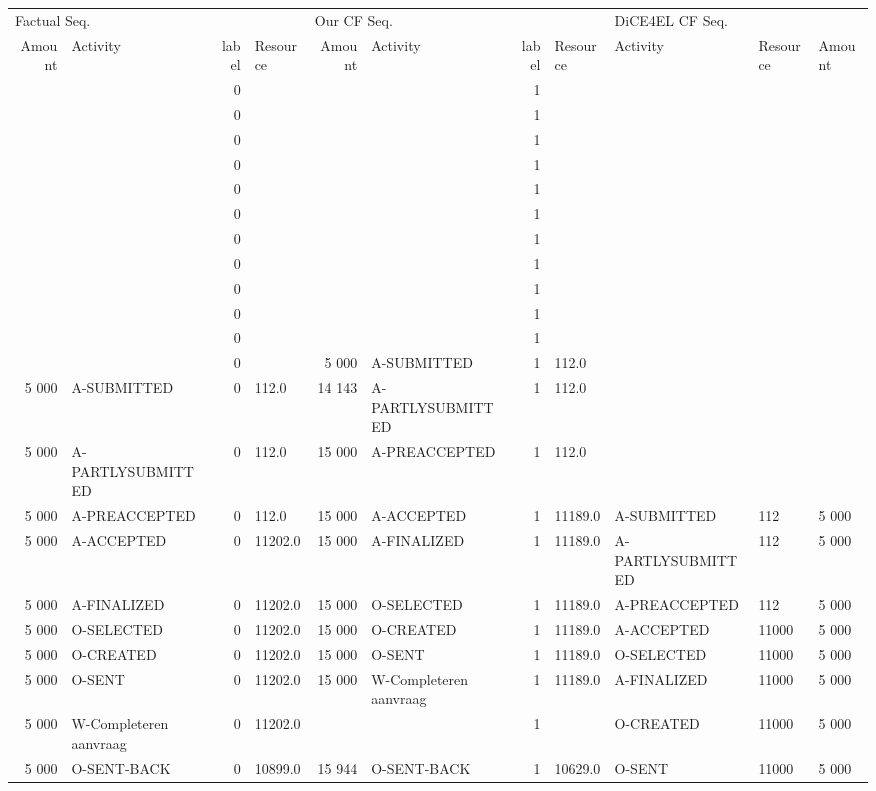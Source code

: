 \begin{tabular}{rlrlrlrllll}
\toprule
\multicolumn{4}{l}{Factual Seq.} & \multicolumn{4}{l}{Our CF Seq.} & \multicolumn{3}{l}{DiCE4EL CF Seq.} \\
Amount & Activity & label & Resource & Amount & Activity & label & Resource & Activity & Resource & Amount \\
\midrule
 &  & 0 &  &  &  & 1 &  &  &  &  \\
 &  & 0 &  &  &  & 1 &  &  &  &  \\
 &  & 0 &  &  &  & 1 &  &  &  &  \\
 &  & 0 &  &  &  & 1 &  &  &  &  \\
 &  & 0 &  &  &  & 1 &  &  &  &  \\
 &  & 0 &  &  &  & 1 &  &  &  &  \\
 &  & 0 &  &  &  & 1 &  &  &  &  \\
 &  & 0 &  &  &  & 1 &  &  &  &  \\
 &  & 0 &  &  &  & 1 &  &  &  &  \\
 &  & 0 &  &  &  & 1 &  &  &  &  \\
 &  & 0 &  &  &  & 1 &  &  &  &  \\
 &  & 0 &  & 5 000 & A-SUBMITTED & 1 & 112.0 &  &  &  \\
5 000 & A-SUBMITTED & 0 & 112.0 & 14 143 & A-PARTLYSUBMITTED & 1 & 112.0 &  &  &  \\
5 000 & A-PARTLYSUBMITTED & 0 & 112.0 & 15 000 & A-PREACCEPTED & 1 & 112.0 &  &  &  \\
5 000 & A-PREACCEPTED & 0 & 112.0 & 15 000 & A-ACCEPTED & 1 & 11189.0 & A-SUBMITTED & 112 & 5 000 \\
5 000 & A-ACCEPTED & 0 & 11202.0 & 15 000 & A-FINALIZED & 1 & 11189.0 & A-PARTLYSUBMITTED & 112 & 5 000 \\
5 000 & A-FINALIZED & 0 & 11202.0 & 15 000 & O-SELECTED & 1 & 11189.0 & A-PREACCEPTED & 112 & 5 000 \\
5 000 & O-SELECTED & 0 & 11202.0 & 15 000 & O-CREATED & 1 & 11189.0 & A-ACCEPTED & 11000 & 5 000 \\
5 000 & O-CREATED & 0 & 11202.0 & 15 000 & O-SENT & 1 & 11189.0 & O-SELECTED & 11000 & 5 000 \\
5 000 & O-SENT & 0 & 11202.0 & 15 000 & W-Completeren aanvraag & 1 & 11189.0 & A-FINALIZED & 11000 & 5 000 \\
5 000 & W-Completeren aanvraag & 0 & 11202.0 &  &  & 1 &  & O-CREATED & 11000 & 5 000 \\
5 000 & O-SENT-BACK & 0 & 10899.0 & 15 944 & O-SENT-BACK & 1 & 10629.0 & O-SENT & 11000 & 5 000 \\

\end{tabular}
